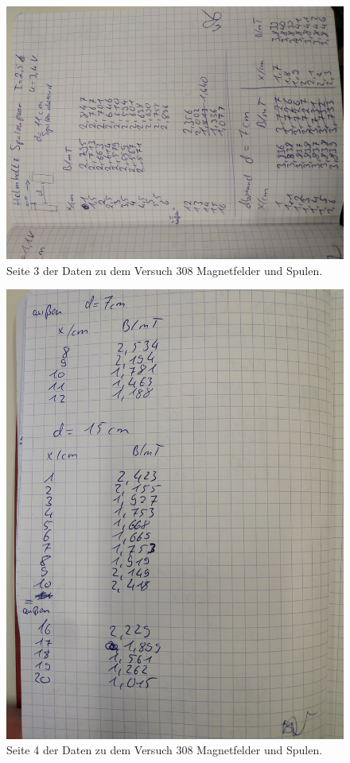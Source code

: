 \begin{figure}
\centering
\includegraphics[width=\textwidth,angle=270]{content/daten3.jpg}
\caption{Seite 3 der Daten zu dem Versuch 308 Magnetfelder und Spulen.}
\end{figure}

\begin{figure}
\centering
\includegraphics[width=\textwidth]{content/daten4.jpg}
\caption{Seite 4 der Daten zu dem Versuch 308 Magnetfelder und Spulen.}
\end{figure}

